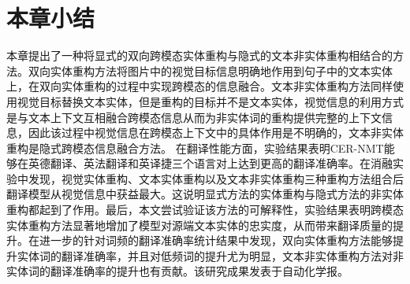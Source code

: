 \section{本章小结}
本章提出了一种将显式的双向跨模态实体重构与隐式的文本非实体重构相结合的方法。双向实体重构方法将图片中的视觉目标信息明确地作用到句子中的文本实体上，在双向实体重构的过程中实现跨模态的信息融合。文本非实体重构方法同样使用视觉目标替换文本实体，但是重构的目标并不是文本实体，视觉信息的利用方式是与文本上下文互相融合跨模态信息从而为非实体词的重构提供完整的上下文信息，因此该过程中视觉信息在跨模态上下文中的具体作用是不明确的，文本非实体重构是隐式跨模态信息融合方法。
在翻译性能方面，实验结果表明CER-NMT能够在英德翻译、英法翻译和英译捷三个语言对上达到更高的翻译准确率。在消融实验中发现，视觉实体重构、文本实体重构以及文本非实体重构三种重构方法组合后翻译模型从视觉信息中获益最大。这说明显式方法的实体重构与隐式方法的非实体重构都起到了作用。最后，本文尝试验证该方法的可解释性，实验结果表明跨模态实体重构方法显著地增加了模型对源端文本实体的忠实度，从而带来翻译质量的提升。在进一步的针对词频的翻译准确率统计结果中发现，双向实体重构方法能够提升实体词的翻译准确率，并且对低频词的提升尤为明显，文本非实体重构方法对非实体词的翻译准确率的提升也有贡献。该研究成果发表于自动化学报。